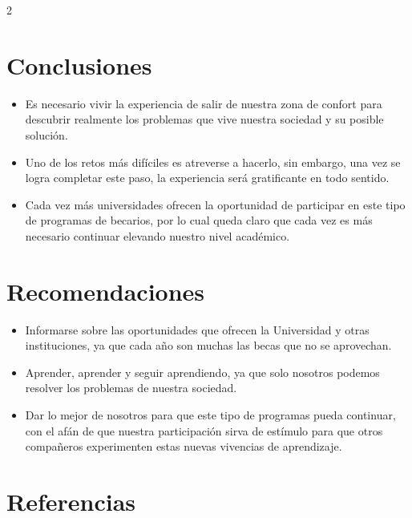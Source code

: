 \documentclass[12pt,spanish,Letterpaper,openany]{book}
\begin{document}
\begin {multicols}{2}
\hypertarget{conclusiones-3}{%
\section{Conclusiones}\label{conclusiones-3}}

\begin{itemize}
\item
  Es necesario vivir la experiencia de salir de nuestra zona de confort para descubrir realmente los problemas que vive nuestra sociedad y su posible solución.
\item
  Uno de los retos más difíciles es atreverse a hacerlo, sin embargo, una vez se logra completar este paso, la experiencia será gratificante en todo sentido.
\item
  Cada vez más universidades ofrecen la oportunidad de participar en este tipo de programas de becarios, por lo cual queda claro que cada vez es más necesario continuar elevando nuestro nivel académico.
\end{itemize}

\hypertarget{recomendaciones-2}{%
\section{Recomendaciones}\label{recomendaciones-2}}

\begin{itemize}
\item
  Informarse sobre las oportunidades que ofrecen la Universidad y otras instituciones, ya que cada año son muchas las becas que no se aprovechan.
\item
  Aprender, aprender y seguir aprendiendo, ya que solo nosotros podemos resolver los problemas de nuestra sociedad.
\item
  Dar lo mejor de nosotros para que este tipo de programas pueda continuar, con el afán de que nuestra participación sirva de estímulo para que otros compañeros experimenten estas nuevas vivencias de aprendizaje.
\end{itemize}

\hypertarget{referencias-3}{%
\section{Referencias}\label{referencias-3}}


\end{multicols}
\end{document}
